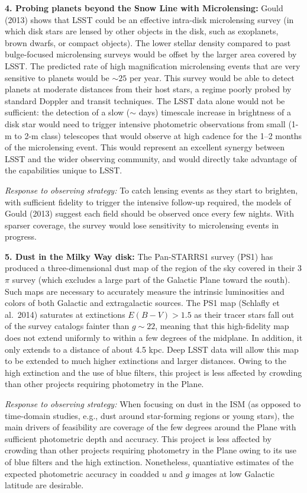 {\bf 4. Probing planets beyond the Snow Line with Microlensing:} Gould
(2013) shows that LSST could be an effective intra-disk microlensing
survey (in which disk stars are lensed by other objects in the disk,
such as exoplanets, brown dwarfs, or compact objects). The lower
stellar density compared to past bulge-focused microlensing surveys
would be offset by the larger area covered by LSST. The predicted rate
of high magnification microlensing events that are very sensitive to
planets would be $\sim 25$ per year. This survey would be able to
detect planets at moderate distances from their host stars, a regime
poorly probed by standard Doppler and transit techniques. The LSST
data alone would not be sufficient: the detection of a slow ($\sim$
days) timescale increase in brightness of a disk star would need to
trigger intensive photometric observations from small (1-m to 2-m
class) telescopes that would observe at high cadence for the 1--2
months of the microlensing event. This would represent an excellent
synergy between LSST and the wider observing community, and would
directly take advantage of the capabilities unique to LSST.

{\it Response to observing strategy:} To catch lensing events as they
start to brighten, with sufficient fidelity to trigger the intensive
follow-up required, the models of Gould (2013) suggest each field
should be observed once every few nights. With sparser coverage,
the survey would lose sensitivity to microlensing events in progress.

{\bf 5. Dust in the Milky Way disk:} The Pan-STARRS1 survey (PS1) has
produced a three-dimensional dust map of the region of the sky covered
in their 3$\pi$ survey (which excludes a large part of the Galactic
Plane toward the south). Such maps are necessary to accurately measure
the intrinsic luminosities and colors of both Galactic and
extragalactic sources. The PS1 map (Schlafly et al.~2014) saturates at
extinctions $E(B-V) > 1.5$ as their tracer stars fall out of the
survey catalogs fainter than $g\sim 22$, meaning that this
high-fidelity map does not extend uniformly to within a few degrees of
the midplane. In addition, it only extends to a distance of about 4.5
kpc. Deep LSST data will allow this map to be extended to much higher
extinctions and larger distances. Owing to the high extinction and the
use of blue filters, this project is less affected by crowding than
other projects requiring photometry in the Plane. 

{\it Response to observing strategy:} When focusing on dust in the ISM (as
opposed to time-domain studies, e.g., dust around star-forming
regions or young stars), the main drivers of feasibility are
coverage of the few degrees around the Plane with sufficient photometric depth
and accuracy. This project is less affected by crowding than other
projects requiring photometry in the Plane owing to its use of blue
filters and the high extinction.  Nonetheless, quantiative estimates of
the expected photometric accuracy in coadded $u$ and $g$ images at low
Galactic latitude are desirable.



